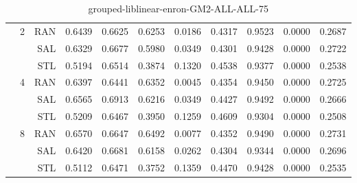 \begin{center}
\begin{table}[htbp]
\begin{tabular}{ | r | r | r | r | r | r | r | r | r | r | r |}
 & \multirow{3}{*}{2} & RAN & 0.6439 & 0.6625 & 0.6253 & 0.0186 & 0.4317 & 0.9523 & 0.0000 & 0.2687\\ \cline{3-11}
 &   & SAL & 0.6329 & 0.6677 & 0.5980 & 0.0349 & 0.4301 & 0.9428 & 0.0000 & 0.2722\\ \cline{3-11}
 &   & STL & 0.5194 & 0.6514 & 0.3874 & 0.1320 & 0.4538 & 0.9377 & 0.0000 & 0.2538\\ \cline{2-11}
 & \multirow{3}{*}{4} & RAN & 0.6397 & 0.6441 & 0.6352 & 0.0045 & 0.4354 & 0.9450 & 0.0000 & 0.2725\\ \cline{3-11}
 &   & SAL & 0.6565 & 0.6913 & 0.6216 & 0.0349 & 0.4427 & 0.9492 & 0.0000 & 0.2666\\ \cline{3-11}
 &   & STL & 0.5209 & 0.6467 & 0.3950 & 0.1259 & 0.4609 & 0.9304 & 0.0000 & 0.2508\\ \cline{2-11}
 & \multirow{3}{*}{8} & RAN & 0.6570 & 0.6647 & 0.6492 & 0.0077 & 0.4352 & 0.9490 & 0.0000 & 0.2731\\ \cline{3-11}
 &   & SAL & 0.6420 & 0.6681 & 0.6158 & 0.0262 & 0.4304 & 0.9344 & 0.0000 & 0.2696\\ \cline{3-11}
 &   & STL & 0.5112 & 0.6471 & 0.3752 & 0.1359 & 0.4470 & 0.9428 & 0.0000 & 0.2535\\ \cline{2-11}
\hline
\end{tabular}
\caption{grouped-liblinear-enron-GM2-ALL-ALL-75}
\end{table}
\end{center}

